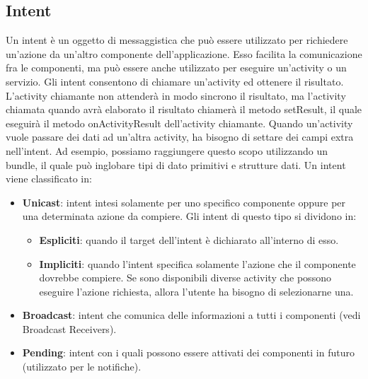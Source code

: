 \subsection{Intent}
Un intent è un oggetto di messaggistica che può essere utilizzato per richiedere un'azione da un'altro componente dell'applicazione. Esso facilita la comunicazione fra le componenti, ma può essere anche utilizzato per eseguire un'activity o un servizio. Gli intent consentono di chiamare un'activity ed ottenere il risultato. L'activity chiamante non attenderà in modo sincrono il risultato, ma l'activity chiamata quando avrà elaborato il risultato chiamerà il metodo setResult, il quale eseguirà il metodo onActivityResult dell'activity chiamante. Quando un'activity vuole passare dei dati ad un'altra activity, ha bisogno di settare dei campi extra nell'intent. Ad esempio, possiamo raggiungere questo scopo utilizzando un bundle, il quale può inglobare tipi di dato primitivi e strutture dati. Un intent viene classificato in:
\begin{itemize}
\item \textbf{Unicast}: intent intesi solamente per uno specifico componente oppure per una determinata azione da compiere. Gli intent di questo tipo si dividono in:
\begin{itemize}
\item \textbf{Espliciti}: quando il target dell'intent è dichiarato all'interno di esso.
\item \textbf{Impliciti}: quando l'intent specifica solamente l'azione che il componente dovrebbe compiere. Se sono disponibili diverse activity che possono eseguire l'azione richiesta, allora l'utente ha bisogno di selezionarne una.
\end{itemize}
\item \textbf{Broadcast}: intent che comunica delle informazioni a tutti i componenti (vedi Broadcast Receivers).
\item \textbf{Pending}: intent con i quali possono essere attivati dei componenti in futuro (utilizzato per le notifiche).
\end{itemize}
